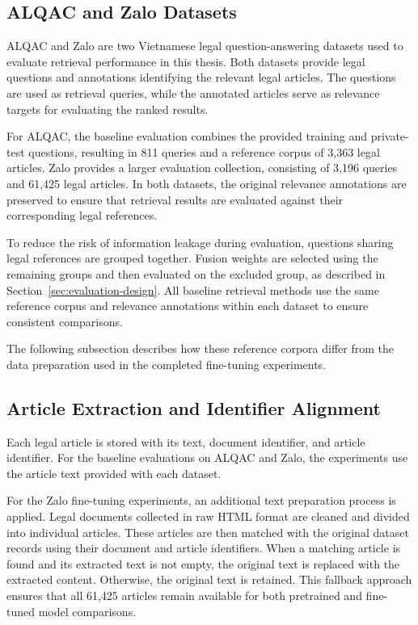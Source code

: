 \subsection{ALQAC and Zalo Datasets}

ALQAC and Zalo are two Vietnamese legal question-answering datasets used to evaluate retrieval performance in this thesis. Both datasets provide legal questions and annotations identifying the relevant legal articles. The questions are used as retrieval queries, while the annotated articles serve as relevance targets for evaluating the ranked results.

For ALQAC, the baseline evaluation combines the provided training and private-test questions, resulting in 811 queries and a reference corpus of 3,363 legal articles. Zalo provides a larger evaluation collection, consisting of 3,196 queries and 61,425 legal articles. In both datasets, the original relevance annotations are preserved to ensure that retrieval results are evaluated against their corresponding legal references.

To reduce the risk of information leakage during evaluation, questions sharing legal references are grouped together. Fusion weights are selected using the remaining groups and then evaluated on the excluded group, as described in Section~\ref{sec:evaluation-design}. All baseline retrieval methods use the same reference corpus and relevance annotations within each dataset to ensure consistent comparisons.

The following subsection describes how these reference corpora differ from the data preparation used in the completed fine-tuning experiments.

\subsection{Article Extraction and Identifier Alignment}
\label{sec:article-extraction}

Each legal article is stored with its text, document identifier, and article identifier. For the baseline evaluations on ALQAC and Zalo, the experiments use the article text provided with each dataset.

For the Zalo fine-tuning experiments, an additional text preparation process is applied. Legal documents collected in raw HTML format are cleaned and divided into individual articles. These articles are then matched with the original dataset records using their document and article identifiers. When a matching article is found and its extracted text is not empty, the original text is replaced with the extracted content. Otherwise, the original text is retained. This fallback approach ensures that all 61,425 articles remain available for both pretrained and fine-tuned model comparisons.

